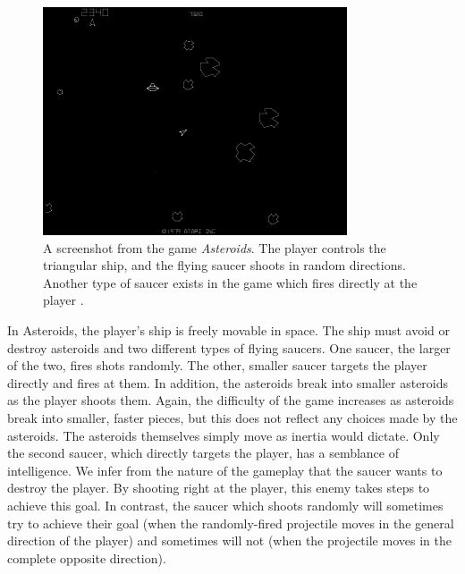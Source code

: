 \begin{figure}[H]
  \centering
  \includegraphics[width=9cm]{figures/Asteroids.png}
  \caption{A screenshot from the game \textit{Asteroids}. The player controls the triangular ship, and the flying saucer shoots in random directions. Another type of saucer exists in the game which fires directly at the player \cite{asteroids79}.}
  \label{fig:Asteroids}
\end{figure}

In Asteroids, the player's ship is freely movable in space. The ship must avoid or destroy asteroids and two different types of flying saucers. One saucer, the larger of the two, fires shots randomly. The other, smaller saucer targets the player directly and fires at them. In addition, the asteroids break into smaller asteroids as the player shoots them. Again, the difficulty of the game increases as asteroids break into smaller, faster pieces, but this does not reflect any choices made by the asteroids. The asteroids themselves simply move as inertia would dictate. Only the second saucer, which directly targets the player, has a semblance of intelligence. We infer from the nature of the gameplay that the saucer wants to destroy the player. By shooting right at the player, this enemy takes steps to achieve this goal. In contrast, the saucer which shoots randomly will sometimes try to achieve their goal (when the randomly-fired projectile moves in the general direction of the player) and sometimes will not (when the projectile moves in the complete opposite direction).\\


